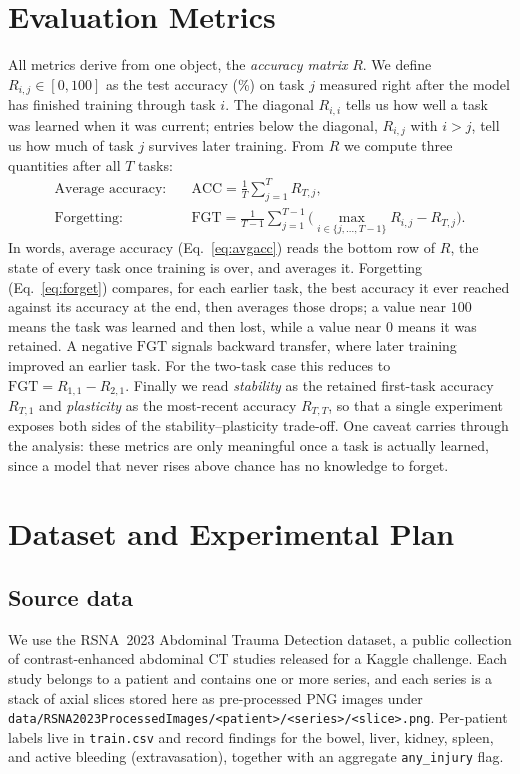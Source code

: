 \documentclass[11pt]{article}
\begin{document}
\section{Evaluation Metrics}\label{sec:metrics}
All metrics derive from one object, the \emph{accuracy matrix} $R$. We define
$R_{i,j}\in[0,100]$ as the test accuracy (\%) on task $j$ measured right after
the model has finished training through task $i$. The diagonal $R_{i,i}$ tells us
how well a task was learned when it was current; entries below the diagonal,
$R_{i,j}$ with $i>j$, tell us how much of task $j$ survives later training. From
$R$ we compute three quantities after all $T$ tasks:
\begin{align}
\text{Average accuracy:}\quad
&\mathrm{ACC}=\frac{1}{T}\sum_{j=1}^{T}R_{T,j},\label{eq:avgacc}\\[2pt]
\text{Forgetting:}\quad
&\mathrm{FGT}=\frac{1}{T-1}\sum_{j=1}^{T-1}
\Big(\max_{i\in\{j,\dots,T-1\}}R_{i,j}-R_{T,j}\Big).\label{eq:forget}
\end{align}
In words, average accuracy (Eq.~\eqref{eq:avgacc}) reads the bottom row of $R$,
the state of every task once training is over, and averages it. Forgetting
(Eq.~\eqref{eq:forget}) compares, for each earlier task, the best accuracy it
ever reached against its accuracy at the end, then averages those drops; a value
near $100$ means the task was learned and then lost, while a value near $0$ means
it was retained. A negative $\mathrm{FGT}$ signals backward transfer, where later
training improved an earlier task. For the two-task case this reduces to
$\mathrm{FGT}=R_{1,1}-R_{2,1}$. Finally we read \emph{stability} as the retained
first-task accuracy $R_{T,1}$ and \emph{plasticity} as the most-recent accuracy
$R_{T,T}$, so that a single experiment exposes both sides of the
stability--plasticity trade-off. One caveat carries through the analysis: these
metrics are only meaningful once a task is actually learned, since a model that
never rises above chance has no knowledge to forget.

\section{Dataset and Experimental Plan}\label{sec:data}
\subsection{Source data}
We use the RSNA~2023 Abdominal Trauma Detection dataset, a public collection of
contrast-enhanced abdominal CT studies released for a Kaggle challenge. Each
study belongs to a patient and contains one or more series, and each series is a
stack of axial slices stored here as pre-processed PNG images under
\texttt{data/RSNA2023ProcessedImages/<patient>/<series>/<slice>.png}. Per-patient
labels live in \texttt{train.csv} and record findings for the bowel, liver,
kidney, spleen, and active bleeding (extravasation), together with an aggregate
\texttt{any\_injury} flag.
\end{document}
